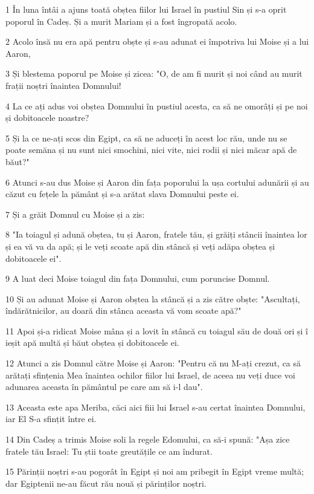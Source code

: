 \par 1 În luna întâi a ajuns toată obștea fiilor lui Israel în pustiul Sin și s-a oprit poporul în Cadeș. Și a murit Mariam și a fost îngropată acolo.
\par 2 Acolo însă nu era apă pentru obște și s-au adunat ei împotriva lui Moise și a lui Aaron,
\par 3 Și blestema poporul pe Moise și zicea: "O, de am fi murit și noi când au murit frații noștri înaintea Domnului!
\par 4 La ce ați adus voi obștea Domnului în pustiul acesta, ca să ne omorâți și pe noi și dobitoacele noastre?
\par 5 Și la ce ne-ați scos din Egipt, ca să ne aduceți în acest loc rău, unde nu se poate semăna și nu sunt nici smochini, nici vite, nici rodii și nici măcar apă de băut?"
\par 6 Atunci s-au dus Moise și Aaron din fața poporului la ușa cortului adunării și au căzut cu fețele la pământ și s-a arătat slava Domnului peste ei.
\par 7 Și a grăit Domnul cu Moise și a zis:
\par 8 "Ia toiagul și adună obștea, tu și Aaron, fratele tău, și grăiți stâncii înaintea lor și ea vă va da apă; și le veți scoate apă din stâncă și veți adăpa obștea și dobitoacele ei".
\par 9 A luat deci Moise toiagul din fața Domnului, cum poruncise Domnul.
\par 10 Și au adunat Moise și Aaron obștea la stâncă și a zis către obște: "Ascultați, îndărătnicilor, au doară din stânca aceasta vă vom scoate apă?"
\par 11 Apoi și-a ridicat Moise mâna și a lovit în stâncă cu toiagul său de două ori și î ieșit apă multă și băut obștea și dobitoacele ei.
\par 12 Atunci a zis Domnul către Moise și Aaron: "Pentru că nu M-ați crezut, ca să arătați sfințenia Mea înaintea ochilor fiilor lui Israel, de aceea nu veți duce voi adunarea aceasta în pământul pe care am să i-l dau".
\par 13 Aceasta este apa Meriba, căci aici fiii lui Israel s-au certat înaintea Domnului, iar El S-a sfințit între ei.
\par 14 Din Cadeș a trimis Moise soli la regele Edomului, ca să-i spună: "Așa zice fratele tău Israel: Tu știi toate greutățile ce am îndurat.
\par 15 Părinții noștri s-au pogorât în Egipt și noi am pribegit în Egipt vreme multă; dar Egiptenii ne-au făcut rău nouă și părinților noștri.

